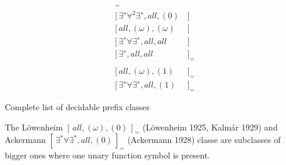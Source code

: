 \begin{table}[hbt]
\begin{align*}
[\,\exists^{∗}\forall^{∗}, all, (0)&\,]_{=} \tag{Bernays, Schönfinkel 1928, Ramsey 1932}
\\
[\,\exists^{∗} \forall^2 \exists^{∗} , all, (0)&\,] \tag{Gödel 1932, Kalmár 1933, Schütte 1934}
\\
[\,all, (\omega), (\omega)&\,] \tag{Löb 1967, Gurevich 1969}
\\
[\,\exists^{∗}\forall\exists^{∗}, all, all&\,] \tag{Gurevich 1973}
\\
[\,\exists^{∗}, all, all&\,]_{=} \tag{Gurevich 1976}
\\
\\
[\,all, (\omega), (1)&\,]_{=} \tag{Rabin 1969} 
\\
[\,\exists^{∗}\forall\exists^{∗}, all, (1)&\,]_{=} \tag{Shelah 1977}
\end{align*}
\caption{Complete list of decidable prefix classes}
\end{table}
The Löwenheim $[\,all, (\omega), (0 )\,]_=$ (Löwenheim 1925, Kalmár 1929)
and Ackermann $[\,\exists^*\forall\exists^*,all,(0)\,]_=$ (Ackermann 1928) 
classe are subclasses of bigger ones where one unary function symbol is present.



\footnotemark
{}